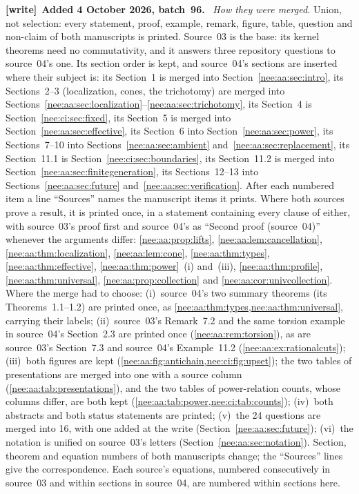 \documentclass[11pt,letterpaper]{article}
\numberwithin{equation}{section}
\theoremstyle{plain}
\theoremstyle{definition}
\theoremstyle{remark}
\newenvironment{writenote}[1][]{\par\smallskip\begingroup\small\raggedright
 \setlength{\parindent}{1.25em}\noindent\textbf{[write]}\if\relax\detokenize{#1}\relax\else~\textbf{#1.}\fi\ }%
 {\par\endgroup\smallskip}
\begin{document}
\begin{writenote}[Added 4 October 2026, batch~96]
\emph{How they were merged.} Union, not selection: every statement, proof, example, remark, figure, table, question and non-claim of both manuscripts is printed. Source~03 is the base: its kernel theorems need no commutativity, and it answers three repository questions to source~04's one. Its section order is kept, and source~04's sections are inserted where their subject is: its Section~1 is merged into Section~\ref{nee:aa:sec:intro}, its Sections~2--3 (localization, cones, the trichotomy) are merged into Sections~\ref{nee:aa:sec:localization}--\ref{nee:aa:sec:trichotomy}, its Section~4 is Section~\ref{nee:ci:sec:fixed}, its Section~5 is merged into Section~\ref{nee:aa:sec:effective}, its Section~6 into Section~\ref{nee:aa:sec:power}, its Sections~7--10 into Sections~\ref{nee:aa:sec:ambient} and~\ref{nee:aa:sec:replacement}, its Section~11.1 is Section~\ref{nee:ci:sec:boundaries}, its Section~11.2 is merged into Section~\ref{nee:aa:sec:finitegeneration}, its Sections~12--13 into Sections~\ref{nee:aa:sec:future} and~\ref{nee:aa:sec:verification}. After each numbered item a line ``Sources'' names the manuscript items it prints. Where both sources prove a result, it is printed once, in a statement containing every clause of either, with source~03's proof first and source~04's as ``Second proof (source~04)'' whenever the arguments differ: \cref{nee:aa:prop:lifts}, \cref{nee:aa:lem:cancellation}, \cref{nee:aa:thm:localization}, \cref{nee:aa:lem:cone}, \cref{nee:aa:thm:types}, \cref{nee:aa:thm:effective}, \cref{nee:aa:thm:power}~(i) and~(iii), \cref{nee:aa:thm:profile}, \cref{nee:aa:thm:universal}, \cref{nee:aa:prop:collection} and \cref{nee:aa:cor:univcollection}. Where the merge had to choose: (i)~source~04's two summary theorems (its Theorems~1.1--1.2) are printed once, as \cref{nee:aa:thm:types,nee:aa:thm:universal}, carrying their labels; (ii)~source~03's Remark~7.2 and the same torsion example in source~04's Section~2.3 are printed once (\cref{nee:aa:rem:torsion}), as are source~03's Section~7.3 and source~04's Example~11.2 (\cref{nee:aa:ex:rationalcuts}); (iii)~both figures are kept (\cref{nee:aa:fig:antichain,nee:ci:fig:upset}); the two tables of presentations are merged into one with a source column (\cref{nee:aa:tab:presentations}), and the two tables of power-relation counts, whose columns differ, are both kept (\cref{nee:aa:tab:power,nee:ci:tab:counts}); (iv)~both abstracts and both status statements are printed; (v)~the 24 questions are merged into 16, with one added at the write (Section~\ref{nee:aa:sec:future}); (vi)~the notation is unified on source~03's letters (Section~\ref{nee:aa:sec:notation}). Section, theorem and equation numbers of both manuscripts change; the ``Sources'' lines give the correspondence. Each source's equations, numbered consecutively in source~03 and within sections in source~04, are numbered within sections here.


\end{writenote}
\end{document}
